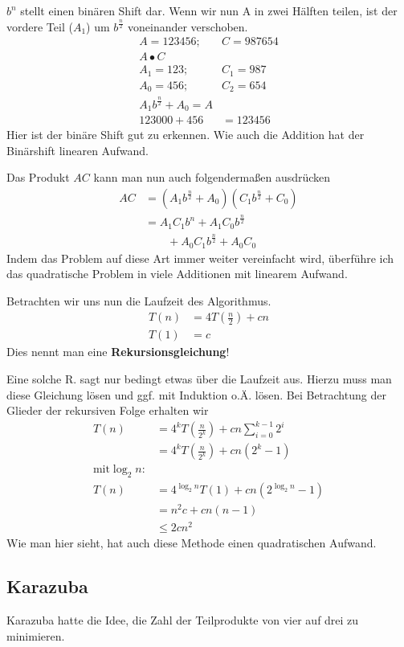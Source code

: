 \documentclass[a4paper,twoside,10pt]{report}
\begin{document}
$b^n$ stellt einen binären Shift dar. Wenn wir nun A in zwei Hälften teilen, ist der vordere Teil ($A_1$) um $b^\frac{n}{2}$ voneinander verschoben.
\begin{eqnarray*}
A=123456;&C=987654\\
A\bullet C&\\
A_1=123;&C_1=987\\
A_0=456;&C_2=654\\
A_1b^\frac{n}{2}+A_0=A\\
123000+456&=123456
\end{eqnarray*}
Hier ist der binäre Shift gut zu erkennen. Wie auch die Addition hat der Binärshift linearen \linebreak Aufwand.

Das Produkt $AC$ kann man nun auch folgendermaßen ausdrücken
\begin{align*}
AC&=(A_1b^{\frac{n}{2}}+A_0)(C_1b^{\frac{n}{2}}+C_0)\\
&=A_1C_1b^n+A_1C_0b^{\frac{n}{2}}\\
&\qquad {}+A_0C_1b^\frac{n}{2}+A_0C_0
\end{align*}
Indem das Problem auf diese Art immer weiter vereinfacht wird, überführe ich das quadratische Problem in viele Additionen mit linearem Aufwand.

Betrachten wir uns nun die Laufzeit des Algorithmus. 
\begin{align*}
T(n)&=4T\left(\frac{n}{2}\right)+cn\\
T(1)&=c
\end{align*}
Dies nennt man eine \textbf{Rekursionsgleichung}!

Eine solche R. sagt nur bedingt etwas über die Laufzeit aus. Hierzu muss man diese Gleichung lösen und ggf. mit Induktion o.Ä. lösen.
Bei Betrachtung der Glieder der rekursiven Folge erhalten wir
\begin{align*}
T(n)&=4^kT\left(\frac{n}{2^k}\right)+cn\sum_{i=0}^{k-1}2^i\\
&=4^kT\left(\frac{n}{2^k}\right)+cn\left(2^k-1\right)\\
\mbox{mit}\log_2n:\\
T(n)&=4^{\log_2n}T(1)+cn\left(2^{\log_2n}-1\right)\\
&=n^2c+cn\left(n-1\right)\\
&\le2cn^2
\end{align*}
Wie man hier sieht, hat auch diese Methode einen quadratischen Aufwand. 

\subsection{Karazuba}
Karazuba hatte die Idee, die Zahl der Teilprodukte von vier auf drei zu minimieren.
\end{document}
